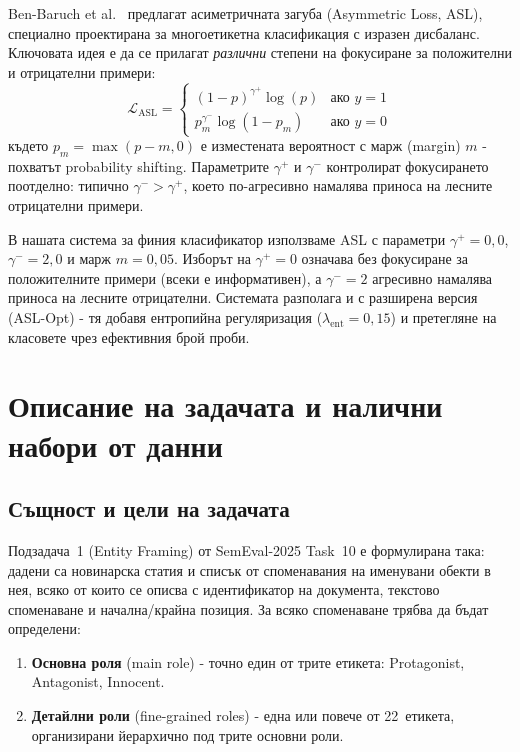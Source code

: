 \documentclass[12pt,a4paper]{report}
\begin{document}
Ben-Baruch et al.\ \cite{benbaruch2021asl} предлагат асиметричната загуба (Asymmetric Loss, ASL), специално проектирана за многоетикетна класификация с изразен дисбаланс. Ключовата идея е да се прилагат \textit{различни} степени на фокусиране за положителни и отрицателни примери:
\begin{equation}
  \mathcal{L}_{\text{ASL}} = \begin{cases}
    (1 - p)^{\gamma^+} \log(p) & \text{ако } y = 1 \\
    p_m^{\gamma^-} \log(1 - p_m) & \text{ако } y = 0
  \end{cases}
  \label{eq:asl}
\end{equation}
където $p_m = \max(p - m, 0)$ е изместената вероятност с марж (margin) $m$ - похватът probability shifting. Параметрите $\gamma^+$ и $\gamma^-$ контролират фокусирането поотделно: типично $\gamma^- > \gamma^+$, което по-агресивно намалява приноса на лесните отрицателни примери.

В нашата система за финия класификатор използваме ASL с параметри $\gamma^+=0{,}0$, $\gamma^-=2{,}0$ и марж $m=0{,}05$. Изборът на $\gamma^+=0$ означава без фокусиране за положителните примери (всеки е информативен), а $\gamma^-=2$ агресивно намалява приноса на лесните отрицателни. Системата разполага и с разширена версия (ASL-Opt) - тя добавя ентропийна регуляризация ($\lambda_{\text{ent}}=0{,}15$) и претегляне на класовете чрез ефективния брой проби.


\chapter{Описание на задачата и налични набори от данни}

\section{Същност и цели на задачата}

Подзадача~1 (Entity Framing) от SemEval-2025 Task~10 е формулирана така: дадени са новинарска статия и списък от споменавания на именувани обекти в нея, всяко от които се описва с идентификатор на документа, текстово споменаване и начална/крайна позиция. За всяко споменаване трябва да бъдат определени:
\begin{enumerate}
  \item \textbf{Основна роля} (main role) - точно един от трите етикета: Protagonist, Antagonist, Innocent.
  \item \textbf{Детайлни роли} (fine-grained roles) - една или повече от 22~етикета, организирани йерархично под трите основни роли.
\end{enumerate}
\end{document}
